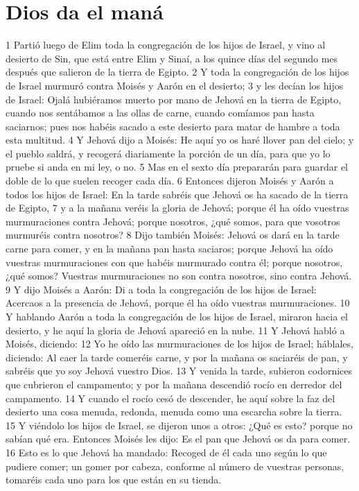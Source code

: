 \section*{Dios da el maná}
1 Partió luego de Elim toda la congregación de los hijos de Israel, y vino al desierto de Sin, que está entre Elim y Sinaí, a los quince días del segundo mes después que salieron de la tierra de Egipto.
2 Y toda la congregación de los hijos de Israel murmuró contra Moisés y Aarón en el desierto;
3 y les decían los hijos de Israel: Ojalá hubiéramos muerto por mano de Jehová en la tierra de Egipto, cuando nos sentábamos a las ollas de carne, cuando comíamos pan hasta saciarnos; pues nos habéis sacado a este desierto para matar de hambre a toda esta multitud.
4 Y Jehová dijo a Moisés: He aquí yo os haré llover pan del cielo; y el pueblo saldrá, y recogerá diariamente la porción de un día, para que yo lo pruebe si anda en mi ley, o no.
5 Mas en el sexto día prepararán para guardar el doble de lo que suelen recoger cada día.
6 Entonces dijeron Moisés y Aarón a todos los hijos de Israel: En la tarde sabréis que Jehová os ha sacado de la tierra de Egipto,
7 y a la mañana veréis la gloria de Jehová; porque él ha oído vuestras murmuraciones contra Jehová; porque nosotros, ¿qué somos, para que vosotros murmuréis contra nosotros?
8 Dijo también Moisés: Jehová os dará en la tarde carne para comer, y en la mañana pan hasta saciaros; porque Jehová ha oído vuestras murmuraciones con que habéis murmurado contra él; porque nosotros, ¿qué somos? Vuestras murmuraciones no son contra nosotros, sino contra Jehová.
9 Y dijo Moisés a Aarón: Di a toda la congregación de los hijos de Israel: Acercaos a la presencia de Jehová, porque él ha oído vuestras murmuraciones.
10 Y hablando Aarón a toda la congregación de los hijos de Israel, miraron hacia el desierto, y he aquí la gloria de Jehová apareció en la nube.
11 Y Jehová habló a Moisés, diciendo:
12 Yo he oído las murmuraciones de los hijos de Israel; háblales, diciendo: Al caer la tarde comeréis carne, y por la mañana os saciaréis de pan, y sabréis que yo soy Jehová vuestro Dios.
13 Y venida la tarde, subieron codornices que cubrieron el campamento; y por la mañana descendió rocío en derredor del campamento.
14 Y cuando el rocío cesó de descender, he aquí sobre la faz del desierto una cosa menuda, redonda, menuda como una escarcha sobre la tierra.
15 Y viéndolo los hijos de Israel, se dijeron unos a otros: ¿Qué es esto? porque no sabían qué era. Entonces Moisés les dijo: Es el pan que Jehová os da para comer.
16 Esto es lo que Jehová ha mandado: Recoged de él cada uno según lo que pudiere comer; un gomer por cabeza, conforme al número de vuestras personas, tomaréis cada uno para los que están en su tienda.

